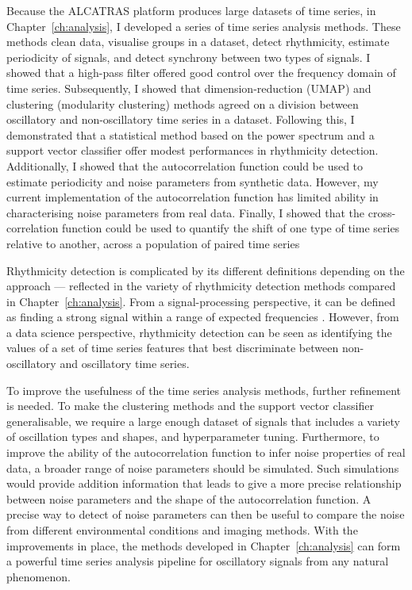 Because the ALCATRAS platform produces large datasets of time series, in Chapter~\ref{ch:analysis}, I developed a series of time series analysis methods.
These methods clean data, visualise groups in a dataset, detect rhythmicity, estimate periodicity of signals, and detect synchrony between two types of signals.
I showed that a high-pass filter offered good control over the frequency domain of time series.
Subsequently, I showed that dimension-reduction (UMAP) and clustering (modularity clustering) methods agreed on a division between oscillatory and non-oscillatory time series in a dataset.
Following this, I demonstrated that a statistical method based on the power spectrum and a support vector classifier offer modest performances in rhythmicity detection.
Additionally, I showed that the autocorrelation function could be used to estimate periodicity and noise parameters from synthetic data.
However, my current implementation of the autocorrelation function has limited ability in characterising noise parameters from real data.
Finally, I showed that the cross-correlation function could be used to quantify the shift of one type of time series relative to another, across a population of paired time series

Rhythmicity detection is complicated by its different definitions depending on the approach --- reflected in the variety of rhythmicity detection methods compared in Chapter~\ref{ch:analysis}.
From a signal-processing perspective, it can be defined as finding a strong signal within a range of expected frequencies \parencite{zielinskiStrengthsLimitationsPeriod2014}.
However, from a data science perspective, rhythmicity detection can be seen as identifying the values of a set of time series features that best discriminate between non-oscillatory and oscillatory time series.

To improve the usefulness of the time series analysis methods, further refinement is needed.
To make the clustering methods and the support vector classifier generalisable, we require a large enough dataset of signals that includes a variety of oscillation types and shapes, and hyperparameter tuning.
Furthermore, to improve the ability of the autocorrelation function to infer noise properties of real data, a broader range of noise parameters should be simulated.
Such simulations would provide addition information that leads to give a more precise relationship between noise parameters and the shape of the autocorrelation function.
A precise way to detect of noise parameters can then be useful to compare the noise from different environmental conditions and imaging methods.
With the improvements in place, the methods developed in Chapter~\ref{ch:analysis} can form a powerful time series analysis pipeline for oscillatory signals from any natural phenomenon.


